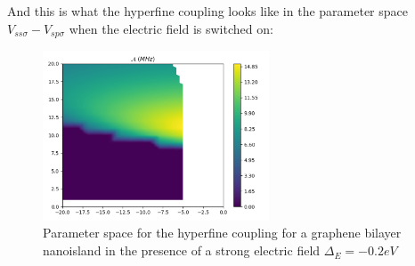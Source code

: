 And this is what the hyperfine coupling looks like in the parameter space $V_{ss\sigma}-V_{sp\sigma}$ when the electric field is switched on:
\begin{figure}[h!]
  \centering
  \includegraphics[width=0.6\textwidth]{defects/fig/SK_A_bi_e-02.pdf}
  \vspace{-5pt}
\caption{Parameter space for the hyperfine coupling for a graphene bilayer nanoisland in the presence of a strong electric field $\Delta_E=-0.2eV$}
\end{figure}
\FloatBarrier
